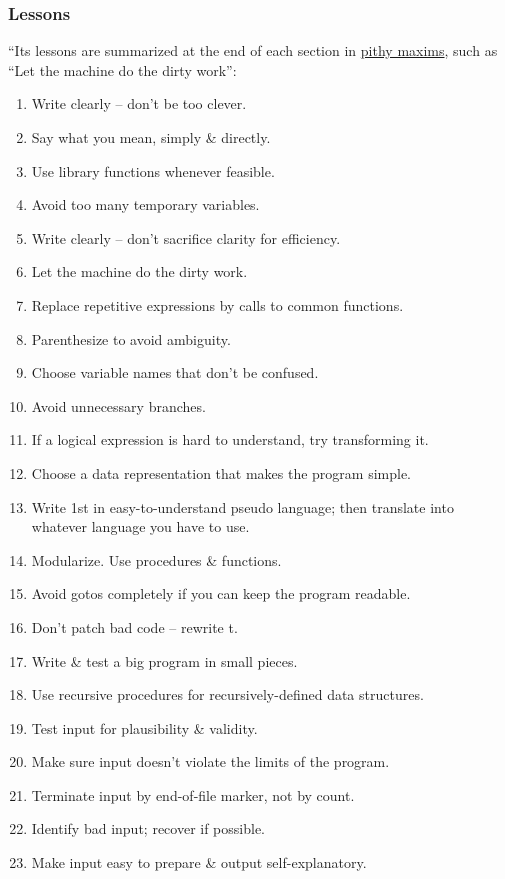 \documentclass{article}
\begin{document}
\subsubsection{Lessons}
``Its lessons are summarized at the end of each section in \href{https://en.wikipedia.org/wiki/Aphorism}{pithy maxims}, such as ``Let the machine do the dirty work'':
\begin{enumerate}
	\item Write clearly -- don't be too clever.
	\item Say what you mean, simply \& directly.
	\item Use library functions whenever feasible.
	\item Avoid too many temporary variables.
	\item Write clearly -- don't sacrifice clarity for efficiency.
	\item Let the machine do the dirty work.
	\item Replace repetitive expressions by calls to common functions.
	\item Parenthesize to avoid ambiguity.
	\item Choose variable names that don't be confused.
	\item Avoid unnecessary branches.
	\item If a logical expression is hard to understand, try transforming it.
	\item Choose a data representation that makes the program simple.
	\item Write 1st in easy-to-understand pseudo language; then translate into whatever language you have to use.
	\item Modularize. Use procedures \& functions.
	\item Avoid gotos completely if you can keep the program readable.
	\item Don't patch bad code -- rewrite t.
	\item Write \& test a big program in small pieces.
	\item Use recursive procedures for recursively-defined data structures.
	\item Test input for plausibility \& validity.
	\item Make sure input doesn't violate the limits of the program.
	\item Terminate input by end-of-file marker, not by count.
	\item Identify bad input; recover if possible.
	\item Make input easy to prepare \& output self-explanatory.

\end{enumerate}
\end{document}
